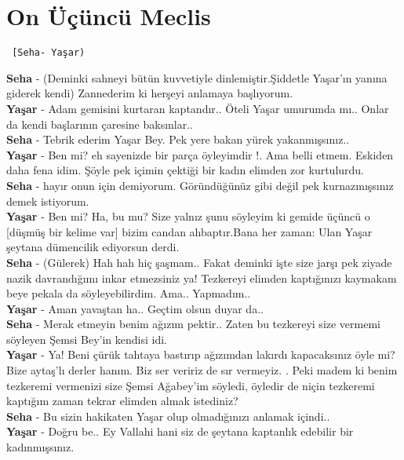 \documentclass[]{book}
\begin{document}
\hypertarget{on-ucuncu-meclis-2}{%
\section{On Üçüncü Meclis}\label{on-ucuncu-meclis-2}}

\begin{verbatim}
 [Seha- Yaşar)
\end{verbatim}

\textbf{Seha} - (Deminki sahneyi bütün kuvvetiyle dinlemiştir.Şiddetle Yaşar'ın yanına giderek kendi) Zannederim ki herşeyi anlamaya başlıyorum.\\
\textbf{Yaşar} - Adam gemisini kurtaran kaptandır.. Öteli Yaşar umurumda mı.. Onlar da kendi başlarının çaresine baksınlar..\\
\textbf{Seha} - Tebrik ederim Yaşar Bey. Pek yere bakan yürek yakanmışsınız..\\
\textbf{Yaşar} - Ben mi? eh sayenizde bir parça öyleyimdir !. Ama belli etmem. Eskiden daha fena idim. Şöyle pek içimin çektiği bir kadın elimden zor kurtulurdu.\\
\textbf{Seha} - hayır onun için demiyorum. Göründüğünüz gibi değil pek kurnazmışsınız demek istiyorum.\\
\textbf{Yaşar} - Ben mi? Ha, bu mu? Size yalnız şunu söyleyim ki gemide üçüncü o {[}düşmüş bir kelime var{]} bizim candan ahbaptır.Bana her zaman: Ulan Yaşar şeytana dümencilik ediyorsun derdi.\\
\textbf{Seha} - (Gülerek) Hah hah hiç şaşmam.. Fakat deminki işte size jarşı pek ziyade nazik davrandığımı inkar etmezsiniz ya! Tezkereyi elimden kaptığınızı kaymakam beye pekala da söyleyebilirdim. Ama.. Yapmadım..\\
\textbf{Yaşar} - Aman yavaştan ha.. Geçtim olsun duyar da..\\
\textbf{Seha} - Merak etmeyin benim ağızım pektir.. Zaten bu tezkereyi size vermemi söyleyen Şemsi Bey'in kendisi idi.\\
\textbf{Yaşar} - Ya! Beni çürük tahtaya bastırıp ağızımdan lakırdı kapacaksınız öyle mi? Bize aytaş'lı derler hanım. Biz ser veririz de sır vermeyiz. . Peki madem ki benim tezkeremi vermenizi size Şemsi Ağabey'im söyledi, öyledir de niçin tezkeremi kaptığım zaman tekrar elimden almak istediniz?\\
\textbf{Seha} - Bu sizin hakikaten Yaşar olup olmadığınızı anlamak içindi..\\
\textbf{Yaşar} - Doğru be.. Ey Vallahi hani siz de şeytana kaptanlık edebilir bir kadınmışsınız.\\
\end{document}
